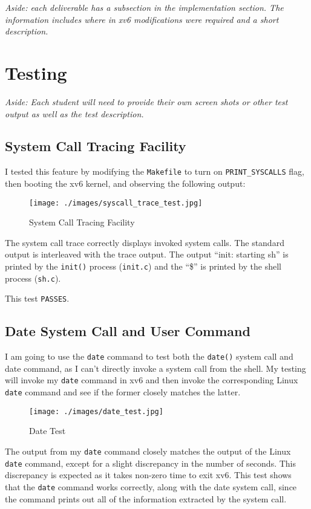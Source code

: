 \documentclass[11pt,letterpaper]{report}
\begin{document}
	\noindent \emph{Aside: each deliverable has a subsection in the implementation section. The information includes where in xv6 modifications were required and a short description.}

\newpage
	\section*{Testing}
	\noindent \emph{Aside: Each student will need to provide their own screen shots or other test output as well as the test description.}
	
	\subsection*{System Call Tracing Facility}
	I tested this feature by modifying the {\tt Makefile} to turn on {\tt PRINT\_SYSCALLS} flag, then booting the xv6 kernel, and observing the following output:
	
\begin{figure}[h!]
\centering
\texttt{[image: ./images/syscall\_trace\_test.jpg]}
\caption[Syscall Trace]{System Call Tracing Facility}
\label{fig:syscalltrace}
\end{figure}
	
	The system call trace correctly displays invoked system calls. The standard output is interleaved with the trace output. The output ``init: starting sh'' is printed by the {\tt init()} process ({\tt init.c}) and the ``\$'' is printed by the shell process ({\tt sh.c}).
	
	This test {\tt PASSES}.

\newpage	
	\subsection*{Date System Call and User Command}
	I am going to use the {\tt date} command to test both the {\tt date()} system call and date command, as I can't directly invoke a system call from the shell. My testing will invoke my {\tt date} command in xv6 and then invoke the corresponding Linux {\tt date} command and see if the former closely matches the latter. 
	
\begin{figure}[h!]
\centering
\texttt{[image: ./images/date\_test.jpg]}
\caption[Date test]{Date Test}
\label{fig:datetest}
\end{figure}	
	
	The output from my {\tt date} command closely matches the output of the Linux {\tt date} command, except for a slight discrepancy in the number of seconds. This discrepancy is expected as it takes non-zero time to exit xv6. This test shows that the {\tt date} command works correctly, along with the date system call, since the command prints out all of the information extracted by the system call.
	
\end{document}
